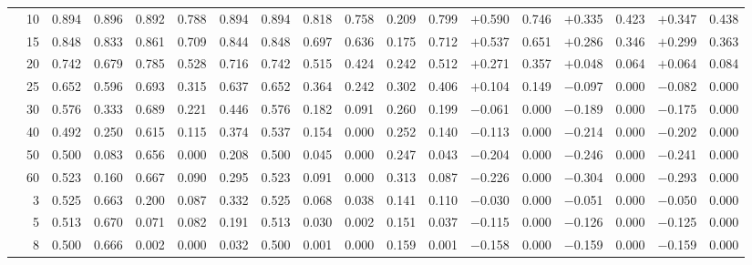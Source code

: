 \documentclass[conference]{IEEEtran}
\theoremstyle{remark}
\begin{document}
\begin{table}[ht]
{\begin{tabular}{p{2.2cm}r rrrr rr rr rr rr rr rr}
  & 10 & 0.894 & 0.896 & 0.892 & 0.788 & 0.894 & 0.894 & 0.818 & 0.758 & 0.209 & 0.799 & $+$0.590 & 0.746 & $+$0.335 & 0.423 & $+$0.347 & 0.438 \\
  & 15 & 0.848 & 0.833 & 0.861 & 0.709 & 0.844 & 0.848 & 0.697 & 0.636 & 0.175 & 0.712 & $+$0.537 & 0.651 & $+$0.286 & 0.346 & $+$0.299 & 0.363 \\
  & 20 & 0.742 & 0.679 & 0.785 & 0.528 & 0.716 & 0.742 & 0.515 & 0.424 & 0.242 & 0.512 & $+$0.271 & 0.357 & $+$0.048 & 0.064 & $+$0.064 & 0.084 \\
  & 25 & 0.652 & 0.596 & 0.693 & 0.315 & 0.637 & 0.652 & 0.364 & 0.242 & 0.302 & 0.406 & $+$0.104 & 0.149 & $-$0.097 & 0.000 & $-$0.082 & 0.000 \\
  & 30 & 0.576 & 0.333 & 0.689 & 0.221 & 0.446 & 0.576 & 0.182 & 0.091 & 0.260 & 0.199 & $-$0.061 & 0.000 & $-$0.189 & 0.000 & $-$0.175 & 0.000 \\
  & 40 & 0.492 & 0.250 & 0.615 & 0.115 & 0.374 & 0.537 & 0.154 & 0.000 & 0.252 & 0.140 & $-$0.113 & 0.000 & $-$0.214 & 0.000 & $-$0.202 & 0.000 \\
  & 50 & 0.500 & 0.083 & 0.656 & 0.000 & 0.208 & 0.500 & 0.045 & 0.000 & 0.247 & 0.043 & $-$0.204 & 0.000 & $-$0.246 & 0.000 & $-$0.241 & 0.000 \\
  & 60 & 0.523 & 0.160 & 0.667 & 0.090 & 0.295 & 0.523 & 0.091 & 0.000 & 0.313 & 0.087 & $-$0.226 & 0.000 & $-$0.304 & 0.000 & $-$0.293 & 0.000 \\
\midrule
{}
  & 3  & 0.525 & 0.663 & 0.200 & 0.087 & 0.332 & 0.525 & 0.068 & 0.038 & 0.141 & 0.110 & $-$0.030 & 0.000 & $-$0.051 & 0.000 & $-$0.050 & 0.000 \\
  & 5  & 0.513 & 0.670 & 0.071 & 0.082 & 0.191 & 0.513 & 0.030 & 0.002 & 0.151 & 0.037 & $-$0.115 & 0.000 & $-$0.126 & 0.000 & $-$0.125 & 0.000 \\
  & 8  & 0.500 & 0.666 & 0.002 & 0.000 & 0.032 & 0.500 & 0.001 & 0.000 & 0.159 & 0.001 & $-$0.158 & 0.000 & $-$0.159 & 0.000 & $-$0.159 & 0.000 \\

\end{tabular}}
\end{table}
\end{document}
